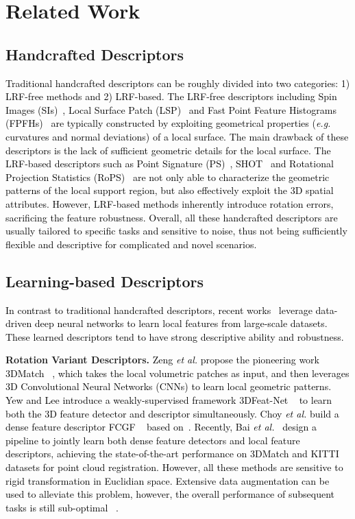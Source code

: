 \documentclass[final]{cvpr}
\newcommand{\qy}[1]{\textcolor{black}{#1}}
\begin{document}
 
\section{Related Work}
\label{sec:related_work}

\subsection{Handcrafted Descriptors}
\qy{Traditional handcrafted descriptors can be roughly divided into two categories: 1) LRF-free methods and 2) LRF-based. The LRF-free descriptors including Spin Images (SIs)~\cite{johnson1999using}, Local Surface Patch (LSP)~\cite{chen20073d} and Fast Point Feature Histograms (FPFHs)~\cite{rusu2009fast} are typically constructed by exploiting geometrical properties (\textit{e.g.} curvatures and normal deviations) of a local surface. The main drawback of these descriptors is the lack of sufficient geometric details for the local surface. The LRF-based descriptors such as Point Signature (PS)~\cite{chua1997point}, SHOT~\cite{tombari2010unique} and Rotational Projection Statistics (RoPS)~\cite{guo2013rotational} are not only able to characterize the geometric patterns of the local support region, but also effectively exploit the 3D spatial attributes. However, LRF-based methods inherently introduce rotation errors, sacrificing the feature robustness. Overall, all these handcrafted descriptors are usually tailored to specific tasks and sensitive to noise, thus not being sufficiently flexible and descriptive for complicated and novel scenarios. }

\subsection{Learning-based Descriptors}
\qy{In contrast to traditional handcrafted descriptors, recent works~\cite{Cohen2018,Esteves2018,Zhou2018, Chen2019,Yu2020,yew2020rpm} leverage data-driven deep neural networks to learn local features from large-scale datasets. These learned descriptors tend to have strong descriptive ability and robustness.} 

\textbf{Rotation Variant Descriptors.} \qy{ Zeng \textit{et al.} propose the pioneering work 3DMatch ~\cite{Zeng2017}, which takes the local volumetric patches as input, and then leverages 3D Convolutional Neural Networks (CNNs) to learn local geometric patterns. Yew and Lee introduce a weakly-supervised framework 3DFeat-Net ~\cite{Yew2018} to learn both the 3D feature detector and descriptor simultaneously. Choy \textit{et al.} build a dense feature descriptor FCGF ~\cite{choy2019fully} based on~\cite{choy20194d}. Recently, Bai \textit{et al.}~\cite{bai2020d3feat} design a pipeline to jointly learn both dense feature detectors and local feature descriptors, achieving the state-of-the-art performance on 3DMatch \cite{Zeng2017} and KITTI~\cite{geiger2012we} datasets for point cloud registration.}
\qy{However, all these methods are sensitive to rigid transformation in Euclidian space. Extensive data augmentation  can be used to alleviate this problem, however, the overall performance of subsequent tasks is still sub-optimal ~\cite{Esteves2018}.}
\end{document}
